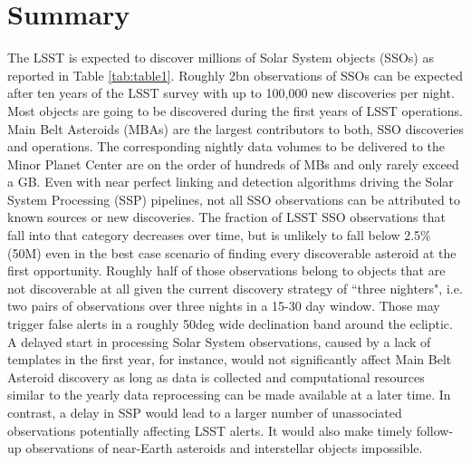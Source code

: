 \section{Summary} \label{sec:abstract}

The \gls{LSST} is expected to discover millions of Solar System objects (SSOs) as reported in Table \ref{tab:table1}.
Roughly 2bn observations of SSOs can be expected after ten years of the \gls{LSST} survey with up to 100,000 new discoveries per night. Most objects are going to be discovered during the first years of \gls{LSST} operations. Main Belt Asteroids (MBAs) are the largest contributors to both, \gls{SSO} discoveries and operations.
The corresponding nightly data volumes to be delivered to the Minor Planet \gls{Center} are on the order of hundreds of MBs and only rarely exceed a \gls{GB}.
Even with near perfect linking and detection algorithms driving the Solar System Processing (\gls{SSP}) pipelines, not all \gls{SSO} observations can be attributed to known sources or new discoveries.
The fraction of \gls{LSST} \gls{SSO} observations that fall into that category decreases over time, but is unlikely to fall below 2.5\% (50M) even in the best case scenario of finding every discoverable asteroid at the first opportunity. Roughly half of those observations belong to objects that are not discoverable at all given the current discovery strategy of ``three nighters", i.e. two pairs of observations over three nights in a 15-30 day window. Those may trigger false alerts in a roughly 50deg wide \gls{declination} band around the ecliptic. A delayed start in processing Solar System observations, caused by a lack of templates in the first year, for instance, would not significantly affect Main Belt Asteroid discovery as long as data is collected and computational resources similar to the yearly data reprocessing can be made available at a later time. In contrast, a delay in \gls{SSP} would lead to a larger number of unassociated observations potentially affecting \gls{LSST} alerts. It would also make timely follow-up observations of near-Earth asteroids and interstellar objects impossible. 

